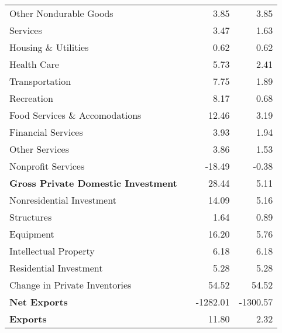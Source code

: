 \documentclass[11pt, letterpaper]{article}\usepackage[]{graphicx}\usepackage[]{color}
\begin{document}
\begin{table}[H]
\begin{tabular}{lrrr}
  \hspace{24mm}  Other Nondurable Goods &  & 3.85 & 3.85 \\ 
  \hspace{8mm}  Services &  & 3.47 & 1.63 \\ 
  \hspace{16mm}  Housing \& Utilities &  & 0.62 & 0.62 \\ 
  \hspace{16mm}  Health Care &  & 5.73 & 2.41 \\ 
  \hspace{16mm}  Transportation &  & 7.75 & 1.89 \\ 
  \hspace{16mm}  Recreation &  & 8.17 & 0.68 \\ 
  \hspace{16mm}  Food Services \& Accomodations &  & 12.46 & 3.19 \\ 
  \hspace{16mm}  Financial Services &  & 3.93 & 1.94 \\ 
  \hspace{16mm}  Other Services &  & 3.86 & 1.53 \\ 
  \hspace{16mm}  Nonprofit Services &  & -18.49 & -0.38 \\ 
  \hspace{0mm} \textbf{Gross Private Domestic Investment} &  & 28.44 & 5.11 \\ 
  \hspace{8mm}  Nonresidential Investment &  & 14.09 & 5.16 \\ 
  \hspace{16mm}  Structures &  & 1.64 & 0.89 \\ 
  \hspace{16mm}  Equipment &  & 16.20 & 5.76 \\ 
  \hspace{16mm}  Intellectual Property &  & 6.18 & 6.18 \\ 
  \hspace{8mm}  Residential Investment &  & 5.28 & 5.28 \\ 
  \hspace{8mm}  Change in Private Inventories &  & 54.52 & 54.52 \\ 
  \hspace{0mm} \textbf{Net Exports} &  & -1282.01 & -1300.57 \\ 
  \hspace{0mm} \textbf{Exports} &  & 11.80 & 2.32 \\ 

\end{tabular}
\end{table}
\end{document}
